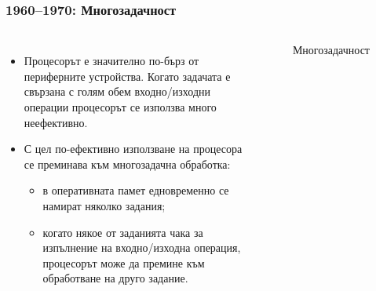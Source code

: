 \documentclass[ignorenonframetext, hyperref=unicode]{beamer}
\begin{document}
\begin{frame}
\frametitle{1960--1970: Многозадачност}
\begin{columns}
\begin{itemize}
  \item Процесорът е значително по-бърз от периферните устройства. Когато
  задачата е свързана с голям обем входно/изходни операции процесорът се
  използва много неефективно.
  \item С цел по-ефективно използване на процесора се преминава към многозадачна
  обработка:
  \begin{itemize}
    \item в оперативната памет едновременно се намират няколко задания;
    \item когато някое от заданията чака за изпълнение на входно/изходна
    операция, процесорът може да премине към обработване на друго задание.
  \end{itemize}    
\end{itemize}
\begin{figure}
\center
{}
\caption{Многозадачност}
\end{figure}
\end{columns}

\end{frame}
\end{document}
